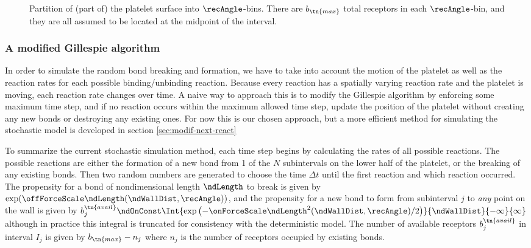 \begin{figure}
  \centering
  
  \caption[Partition of (part of) the platelet surface into
  $\recAngle$-bins.]{Partition of (part of) the platelet surface into
    $\recAngle$-bins. There are $b_\tn{max}$ total receptors in each
    $\recAngle$-bin, and they are all assumed to be located at the
    midpoint of the interval.}
  \label{fig:plt-bins}
\end{figure}

\subsubsection{A modified Gillespie algorithm}
\label{sec:modif-gill-algor}

In order to simulate the random bond breaking and formation, we have
to take into account the motion of the platelet as well as the
reaction rates for each possible binding/unbinding reaction. Because
every reaction has a spatially varying reaction rate and the platelet
is moving, each reaction rate changes over time. A naive way to
approach this is to modify the Gillespie algorithm by enforcing some
maximum time step, and if no reaction occurs within the maximum
allowed time step, update the position of the platelet without
creating any new bonds or destroying any existing ones. For now this
is our chosen approach, but a more efficient method for simulating the
stochastic model is developed in section \ref{sec:modif-next-react}

To summarize the current stochastic simulation method, each time step
begins by calculating the rates of all possible reactions. The
possible reactions are either the formation of a new bond from 1 of
the $N$ subintervals on the lower half of the platelet, or the
breaking of any existing bonds. Then two random numbers are generated
to choose the time $\Delta t$ until the first reaction and which
reaction occurred. The propensity for a bond of nondimensional length
$\ndLength$ to break is given by
$\exp(\offForceScale \ndLength(\ndWallDist, \recAngle))$, and the
propensity for a new bond to form from subinterval $j$ to \emph{any}
point on the wall is given by
$b_j^\tn{avail} \ndOnConst\Int{\exp\left(-\onForceScale \ndLength^2
  (\ndWallDist, \recAngle)/2\right)} {\ndWallDist} {-\infty} {\infty}$
although in practice this integral is truncated for consistency with
the deterministic model. The number of available receptors
$b_j^\tn{avail}$ in interval $I_j$ is given by $b_\tn{max} - n_j$
where $n_j$ is the number of receptors occupied by existing bonds.

